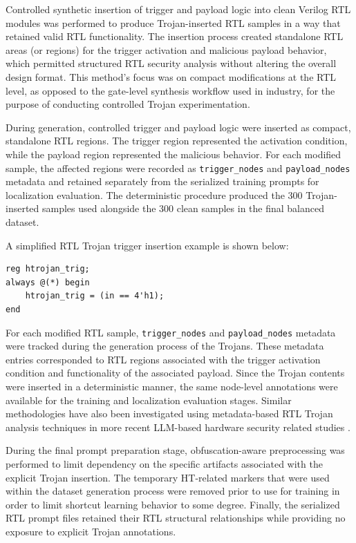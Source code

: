 \documentclass[conference]{IEEEtran}
\begin{document}
Controlled synthetic insertion of trigger and payload logic into clean Verilog RTL modules was performed to produce Trojan-inserted RTL samples in a way that retained valid RTL functionality. The insertion process created standalone RTL areas (or regions) for the trigger activation and malicious payload behavior, which permitted structured RTL security analysis without altering the overall design format. This method’s focus was on compact modifications at the RTL level, as opposed to the gate-level synthesis workflow used in industry, for the purpose of conducting controlled Trojan experimentation.

During generation, controlled trigger and payload logic were inserted as compact, standalone RTL regions. The trigger region represented the activation condition, while the payload region represented the malicious behavior. For each modified sample, the affected regions were recorded as \texttt{trigger\_nodes} and \texttt{payload\_nodes} metadata and retained separately from the serialized training prompts for localization evaluation. The deterministic procedure produced the 300 Trojan-inserted samples used alongside the 300 clean samples in the final balanced dataset.

A simplified RTL Trojan trigger insertion example is shown below:

\begin{verbatim}
reg htrojan_trig;
always @(*) begin
    htrojan_trig = (in == 4'h1);
end
\end{verbatim}

For each modified RTL sample, \texttt{trigger\_nodes} and \texttt{payload\_nodes} metadata were tracked during the generation process of the Trojans. These metadata entries corresponded to RTL regions associated with the trigger activation condition and functionality of the associated payload. Since the Trojan contents were inserted in a deterministic manner, the same node-level annotations were available for the training and localization evaluation stages. Similar methodologies have also been investigated using metadata-based RTL Trojan analysis techniques in more recent LLM-based hardware security related studies \cite{kundu2025pearl,trojanwhisper}.

During the final prompt preparation stage, obfuscation-aware preprocessing was performed to limit dependency on the specific artifacts associated with the explicit Trojan insertion. The temporary HT-related markers that were used within the dataset generation process were removed prior to use for training in order to limit shortcut learning behavior to some degree. Finally, the serialized RTL prompt files retained their RTL structural relationships while providing no exposure to explicit Trojan annotations.
\end{document}
